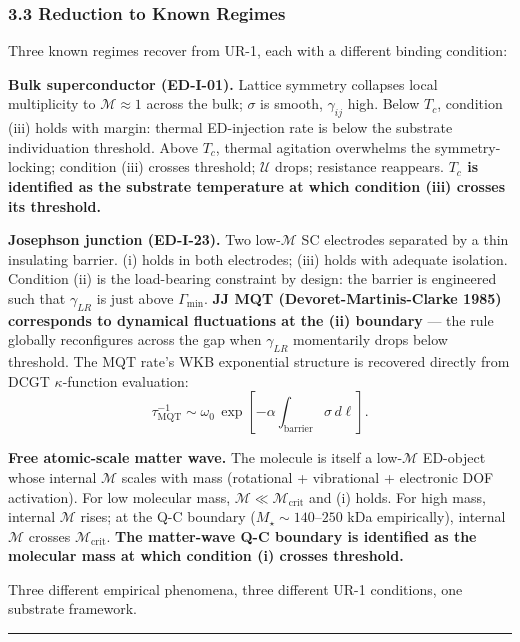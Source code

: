 \documentclass[
  11pt,
  a4paper,
]{article}
\begin{document}
\subsubsection{3.3 Reduction to Known
Regimes}\label{reduction-to-known-regimes}

Three known regimes recover from UR-1, each with a different binding
condition:

\textbf{Bulk superconductor (ED-I-01).} Lattice symmetry collapses local
multiplicity to \(\mathcal{M} \approx 1\) across the bulk; \(\sigma\) is
smooth, \(\gamma_{ij}\) high. Below \(T_c\), condition (iii) holds with
margin: thermal ED-injection rate is below the substrate individuation
threshold. Above \(T_c\), thermal agitation overwhelms the
symmetry-locking; condition (iii) crosses threshold; \(\mathcal{U}\)
drops; resistance reappears. \textbf{\(T_c\) is identified as the
substrate temperature at which condition (iii) crosses its threshold.}

\textbf{Josephson junction (ED-I-23).} Two low-\(\mathcal{M}\) SC
electrodes separated by a thin insulating barrier. (i) holds in both
electrodes; (iii) holds with adequate isolation. Condition (ii) is the
load-bearing constraint by design: the barrier is engineered such that
\(\gamma_{LR}\) is just above \(\Gamma_{\mathrm{min}}\). \textbf{JJ MQT
(Devoret-Martinis-Clarke 1985) corresponds to dynamical fluctuations at
the (ii) boundary} --- the rule globally reconfigures across the gap
when \(\gamma_{LR}\) momentarily drops below threshold. The MQT rate's
WKB exponential structure is recovered directly from DCGT
\(\kappa\)-function evaluation: \[
\tau_{\mathrm{MQT}}^{-1} \sim \omega_0\,\exp\!\left[-\alpha\!\int_{\mathrm{barrier}}\sigma\,d\ell\right].
\]

\textbf{Free atomic-scale matter wave.} The molecule is itself a
low-\(\mathcal{M}\) ED-object whose internal \(\mathcal{M}\) scales with
mass (rotational + vibrational + electronic DOF activation). For low
molecular mass, \(\mathcal{M} \ll \mathcal{M}_{\mathrm{crit}}\) and (i)
holds. For high mass, internal \(\mathcal{M}\) rises; at the Q-C
boundary (\(M_\star \sim 140\)--\(250\) kDa empirically), internal
\(\mathcal{M}\) crosses \(\mathcal{M}_{\mathrm{crit}}\). \textbf{The
matter-wave Q-C boundary is identified as the molecular mass at which
condition (i) crosses threshold.}

Three different empirical phenomena, three different UR-1 conditions,
one substrate framework.

\begin{center}\rule{0.5\linewidth}{0.5pt}\end{center}
\end{document}
